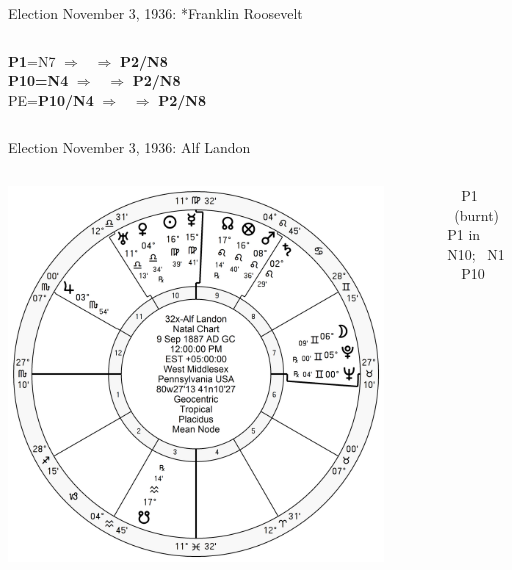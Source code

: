 \begin{frame}[t]{Election November 3, 1936: *Franklin Roosevelt}
\begin{columns}[T, onlytextwidth]
\textbf{\dgreen P1}=N7
	$\Rightarrow$ \Jupiter\, $\Rightarrow$ \textbf{\dgreen P2/N8} \\
\textbf{\red P10=N4}
	$\Rightarrow$  \Jupiter\, $\Rightarrow$ \textbf{\dgreen P2/N8} \\
PE=\textbf{\red P10/N4}
	$\Rightarrow$  \Jupiter\, $\Rightarrow$   \textbf{\dgreen P2/N8}


\end{columns}
\end{frame}

\begin{frame}[t]{Election November 3, 1936: Alf Landon}
\small
\begin{columns}[T, onlytextwidth]
\vspace{-1em}
{\includegraphics[width=0.9\textwidth]{charts/Landon.png}}
\fontsize{8pt}{9pt}\selectfont

\Jupiter\, \Sextile\, P1 \\
\Mercury\, (burnt) \Trine\, P1 in N10; \Square\, N1 \\
\Saturn\, \Sextile\, P10



\end{columns}
\end{frame}
